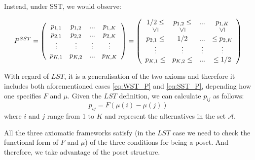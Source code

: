 \documentclass[11pt]{amsart}
\newcommand{\vertgeq}{\rotatebox{90}{$\leq$}}
\begin{document}
Instead, under SST, we would observe:
\begin{center}
\begin{equation}
\label{eq:SST_P}
P^{SST} = 
\left(\begin{array}{cccc}p_{1,1} & p_{1,2} &  ... & p_{1,K} \\ p_{2,1} & p_{2,2} & ... & p_{2,K} \\ \vdots & \vdots & \vdots & \vdots \\ p_{K,1}& p_{K,2 }& ... & p_{K,K}\end{array}\right) =  
\left(\begin{array}{cccc} 1/2 \leq & p_{1,2}\leq &  ... &  p_{1,K}  \\ \vertgeq &  \vertgeq &  & \vertgeq \\
 p_{2,1} \leq & 1/2 & ... & \leq p_{2,K} \\ \vdots & \vdots & \vdots & \vdots \\ p_{K,1} \leq & p_{K,2 } \leq & ... & \leq 1/2 \end{array}\right)  
 \end{equation} 
\end{center}


With regard of $LST$, it is a generalisation of the two axioms and therefore it includes both aforementioned cases \eqref{eq:WST_P} and \eqref{eq:SST_P}, depending how one specifies $F$ and $\mu$. Given the $LST$ definition, we can calculate $p_{ij}$ as follows:
\begin{equation}
p_{ij} = F(\mu(i) - \mu(j))
\end{equation}
where $i$ and $j$ range from 1 to $K$ and represent the alternatives in the set $\mathcal{A}$.

All the three axiomatic frameworks satisfy (in the $LST$ case we need to check the functional form of $F$ and $\mu$) of the three conditions for being a poset. And therefore, we take advantage of the poset structure.
\end{document}
